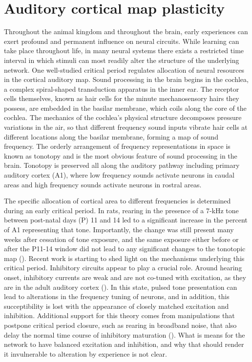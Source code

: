 
\section{Auditory cortical map plasticity}

Throughout the animal kingdom and throughout the brain, early experiences can exert profound and permanent influence on neural circuits. While learning can take place throughout life, in many neural systems there exists a restricted time interval in which stimuli can most readily alter the structure of the underlying network. One well-studied critical period regulates allocation of neural resources in the cortical auditory map. Sound processing in the brain begins in the cochlea, a complex spiral-shaped transduction apparatus in the inner ear. The receptor cells themselves, known as hair cells for the minute mechanosensory hairs they possess, are embedded in the basilar membrane, which coils along the core of the cochlea. The mechanics of the cochlea's physical structure decomposes pressure variations in the air, so that different frequency sound inputs vibrate hair cells at different locations along the basilar membrane, forming a map of sound frequency. The orderly arrangement of frequency representations in space is known as tonotopy and is the most obvious feature of sound processing in the brain. Tonotopy is preserved all along the auditory pathway including primary auditory cortex (A1), where low frequency sounds activate neurons in caudal areas and high frequency sounds activate neurons in rostral areas.

The specific allocation of cortical area to different frequencies is determined during an early critical period. In rats, rearing in the presence of a 7-kHz tone between post-natal days (P) 11 and 14 led to a significant increase in the percent of A1 representing that tone. Importantly, the change was still present many weeks after cessation of tone exposure, and the same exposure either before or after the P11-14 window did not lead to any significant changes to the tonotopic map (\cite{DeVillers-Sidani2007}). Recent work is starting to shed light on the mechanisms underlying this critical period. Inhibitory circuits appear to play a crucial role. Around hearing onset, inhibitory currents are weak and are not co-tuned with excitation, as they are in the adult auditory cortex (\cite{Dorrn2010}). In this state, pulsed tone presentation can lead to alterations in the frequency tuning of neurons, and in addition, this succeptibility is lost with the appearance of closely matched excitation and inhibition. Additional support for this theory comes from manipulations that postpone critical period closure, such as rearing in broadband noise, that also delay the normal time course of inhibitory maturation (\cite{DeVillers-Sidani2008}). What is means for the network to have balanced excitation and inhibition, and why that should render it invulnerable to alteration by experience is not clear.

